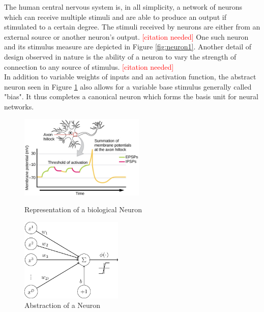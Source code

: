 The human central nervous system is, in all simplicity, a network of neurons which can receive multiple stimuli and are able to produce an output if stimulated to a certain degree. The stimuli received by neurons are either from an external source or another neuron's output.
\textcolor{red}{[citation needed]}
One such neuron and its stimulus measure are depicted in Figure \ref{fig:neuron1}. Another detail of design observed in nature is the ability of a neuron to vary the strength of connection to any source of stimulus. 
\textcolor{red}{[citation needed]}\\
In addition to variable weights of inputs and an activation function, the abstract neuron
seen in Figure \ref{fig:neuron2} also allows for a variable base stimulus generally called "bias". It thus completes a canonical neuron which forms the basis unit for neural networks.\\


\begin{figure}
	\centering
	\begin{minipage}{0.45\textwidth}
		\centering
		\includegraphics[height=150px]{gfx/Biological_Neuron.jpg}
		\caption{Representation of a biological Neuron}
		\label{fig:neuron1}
	\end{minipage}\hfill
	\begin{minipage}{0.45\textwidth}
		\centering
		\includegraphics[height=150px]{gfx/Abstract_Neuron.png}
		\caption{Abstraction of a Neuron}
		\label{fig:neuron2}
	\end{minipage}
\end{figure}

